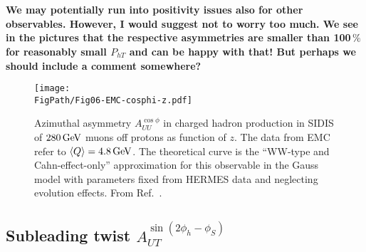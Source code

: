 \documentclass[a4paper,11pt]{article}
\newcommand{\blue}[1]{{\color{blue} #1}}
\newcommand{\la}{\langle}
\newcommand{\ra}{\rangle}
\newcommand{\PS}[1]{\blue{\bf\boldmath #1}}
\def\Phperp{P_{hT}}
\newcommand*{\FigPath}{./figs}%
\begin{document}
\

\ \\
\PS{We may potentially run into positivity issues also for other observables. 
However, I would suggest not to worry too much. We see in the pictures that 
the respective asymmetries are smaller than 100$\,\%$ for reasonably small 
$\Phperp$ and can be happy with that! But perhaps we should include a 
comment somewhere?}


        \begin{figure}[b!]
        \vspace{-0.6cm}
        \texttt{[image: \\FigPath/Fig06-EMC-cosphi-z.pdf]}
        \vspace{-0.5cm}
        \caption{\label{Fig-02:EMC}
        Azimuthal asymmetry $A_{UU}^{\cos\phi}$ in charged hadron 
        production in SIDIS of $280\,{\rm GeV}$ muons off protons
        as function of $z$. The data from EMC \cite{Aubert:1983cz}
        refer to $\la Q\ra=4.8\,{\rm GeV}$. The theoretical
        curve is the ``WW-type and Cahn-effect-only'' approximation 
        for this observable in the Gauss model with parameters 
        fixed from HERMES data and neglecting evolution effects. 
	From Ref.~\cite{Schweitzer:2010tt}.}
        \end{figure}

\newpage
\subsection{\boldmath Subleading twist  $A_{UT}^{\sin(2\phi_h-\phi_S)}$ }
\label{Sec-7.8:FUTsin2phi-phiS}
\end{document}
